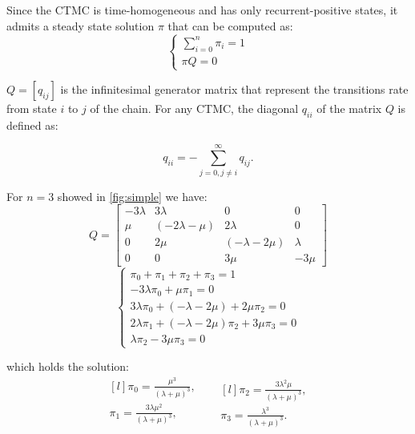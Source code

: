 Since the \ac{CTMC} is time-homogeneous and has only recurrent-positive states, it admits a steady state solution $\pi$ that can be computed as:
\begin{equation*}
    \begin{cases}
        \sum_{i=0}^{n} \pi_i = 1 \\[0.5em]
        \pi Q = 0
    \end{cases}
\end{equation*}

$Q = [q_{ij}]$ is the infinitesimal generator matrix that represent the transitions rate from state $i$ to $j$ of the chain.
For any \ac{CTMC}, the diagonal $q_{ii}$ of the matrix $Q$ is defined as:

\begin{equation*}
    q_{ii} = - \!\!\! \sum_{j = 0, j \neq i}^{\infty} q_{ij}.
\end{equation*}

For $n=3$ showed in \cref{fig:simple} we have:
\begin{equation*}
Q =
\begin{bmatrix}
    -3\lambda   & 3\lambda            & 0                   & 0         \\
    \mu         & (-2\lambda - \mu)   & 2\lambda            & 0         \\
    0           & 2\mu                & (-\lambda - 2\mu)   & \lambda   \\
    0           & 0                   & 3\mu                & -3\mu
\end{bmatrix}
\end{equation*}
\begin{equation*}
    \begin{cases}
        \pi_0 + \pi_1 + \pi_2 + \pi_3 = 1 \\
        -3\lambda\pi_0 + \mu\pi_1 = 0 \\
        3\lambda\pi_0 + (-\lambda-2\mu) + 2\mu\pi_2 = 0 \\
        2\lambda\pi_1 + (-\lambda-2\mu)\pi_2 + 3\mu\pi_3 = 0 \\
        \lambda\pi_2 - 3\mu\pi_3 = 0
    \end{cases}
\end{equation*}

which holds the solution:
\begin{equation*}
    \begin{aligned}[l]
        \pi_0 = \frac{\mu^3}{(\lambda + \mu)^3}, \\[1em]
        \pi_1 = \frac{3\lambda\mu^2}{(\lambda + \mu)^3}, \\
    \end{aligned}
    \;\;\;\;\;
    \begin{aligned}[l]
        \pi_2 = \frac{3\lambda^2\mu}{(\lambda + \mu)^3}, \\[1em]
        \pi_3 = \frac{\lambda^3}{(\lambda + \mu)^3}.
    \end{aligned}
\end{equation*}

